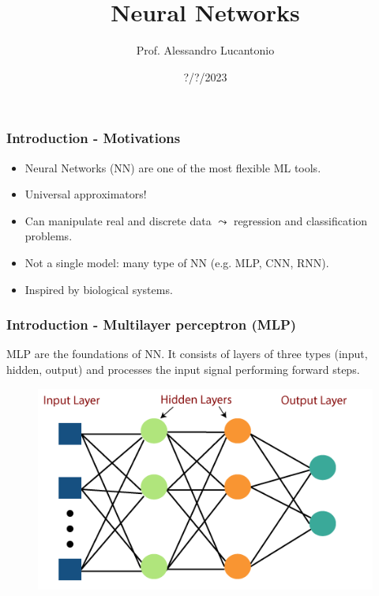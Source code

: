 \documentclass{beamer}
\title{Neural Networks}
\author{Prof. Alessandro Lucantonio}
\institute{Aarhus University - Department of Mechanical and Production Engineering}
\date{?/?/2023}
\begin{document}
	\frame{\titlepage}
	
	\begin{frame}
		\frametitle{Introduction - Motivations}
		\begin{itemize}
			\setlength\itemsep{5mm}
			\item Neural Networks (NN) are one of the most flexible ML tools.
			\item Universal approximators!
			\item Can manipulate real and discrete data $\leadsto$ regression and classification problems.
			\item Not a single model: many type of NN (e.g. MLP, CNN, RNN).
			\item Inspired by biological systems.
		\end{itemize}
	\end{frame}

	\begin{frame}
		\frametitle{Introduction - Multilayer perceptron (MLP)}
		MLP are the foundations of NN. It consists of layers of three types (input, hidden, output) and processes the input signal performing forward steps.
		\begin{figure}
			\centering
			\includegraphics[scale=0.4]{images/mlp-visualization}
		\end{figure}
	\end{frame}
\end{document}
